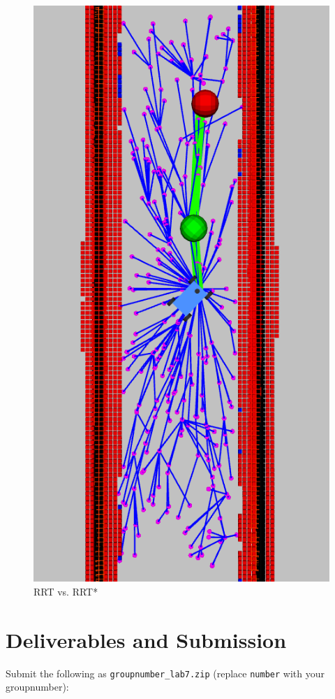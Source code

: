 \documentclass[letta4 paper]{article}
\numberwithin{equation}{section}
\newcommand{\0}{\mathbf{0}}
\begin{document}
\begin{figure}[!hb]
\begin{center}
			\includegraphics[scale=0.35]{rrt_star.png}
		\end{center}
		\caption{RRT vs. RRT*}
		\label{fig:rrt_rrt_star}
	\end{figure}

	\newpage
	\section{Deliverables and Submission}
		Submit the following as \texttt{groupnumber\_lab7.zip} (replace \texttt{number} with your groupnumber):
	
\end{document}
